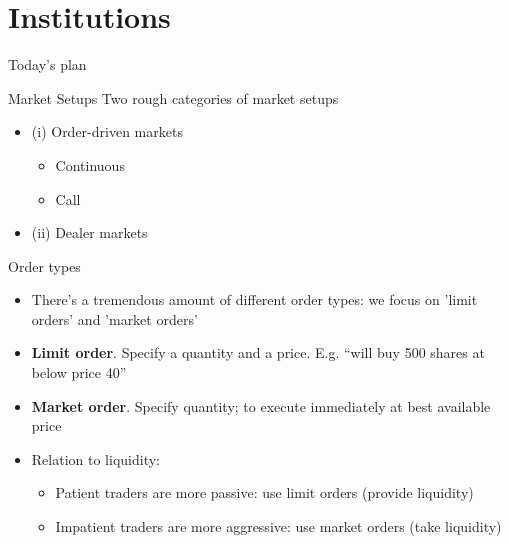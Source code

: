 \documentclass[english,10pt]{beamer}
\theoremstyle{definition}
\begin{document}
\section{Institutions}

\begin{frame}{Today's plan}
\tableofcontents[currentsection]
\end{frame}




\begin{frame}{Market Setups}
Two rough categories of market setups
\begin{itemize}
	\item (i) Order-driven markets
	\begin{itemize}
		\item Continuous
		\item Call
	\end{itemize}
	\item (ii) Dealer markets
\end{itemize}
\end{frame}


\begin{frame}{Order types}
\begin{itemize}
	\item There's a tremendous amount of different order types: we focus on 'limit orders' and 'market orders'
	\item \textbf{Limit order}. Specify a quantity and a price. E.g. ``will buy 500 shares at below price 40''
	\item \textbf{Market order}. Specify quantity; to execute immediately at best available price
	\item Relation to liquidity:
	\begin{itemize}
		\item Patient traders are more passive: use limit orders (provide liquidity)
		\item Impatient traders are more aggressive: use market orders (take liquidity)
	\end{itemize}
\end{itemize}
\end{frame}
\end{document}
